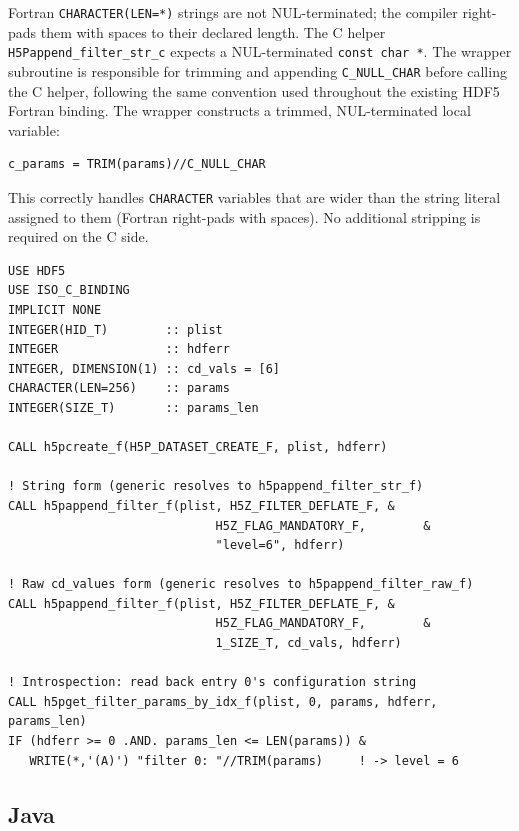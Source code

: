 \documentclass[../RFC-HDFG-2026-001.tex]{subfiles}
\begin{document}
Fortran \texttt{CHARACTER(LEN=*)} strings are not NUL-terminated; the
compiler right-pads them with spaces to their declared length.  The C
helper \texttt{H5Pappend\_filter\_str\_c} expects a NUL-terminated
\texttt{const char~*}.  The wrapper subroutine is responsible for trimming
and appending \texttt{C\_NULL\_CHAR} before calling the C helper, following
the same convention used throughout the existing HDF5 Fortran binding.
The wrapper constructs a trimmed, NUL-terminated local variable:

\begin{verbatim}
c_params = TRIM(params)//C_NULL_CHAR
\end{verbatim}

This correctly handles \texttt{CHARACTER} variables that are wider than the
string literal assigned to them (Fortran right-pads with spaces).  No
additional stripping is required on the C side.


\begin{verbatim}
USE HDF5
USE ISO_C_BINDING
IMPLICIT NONE
INTEGER(HID_T)        :: plist
INTEGER               :: hdferr
INTEGER, DIMENSION(1) :: cd_vals = [6]
CHARACTER(LEN=256)    :: params
INTEGER(SIZE_T)       :: params_len

CALL h5pcreate_f(H5P_DATASET_CREATE_F, plist, hdferr)

! String form (generic resolves to h5pappend_filter_str_f)
CALL h5pappend_filter_f(plist, H5Z_FILTER_DEFLATE_F, &
                             H5Z_FLAG_MANDATORY_F,        &
                             "level=6", hdferr)

! Raw cd_values form (generic resolves to h5pappend_filter_raw_f)
CALL h5pappend_filter_f(plist, H5Z_FILTER_DEFLATE_F, &
                             H5Z_FLAG_MANDATORY_F,        &
                             1_SIZE_T, cd_vals, hdferr)

! Introspection: read back entry 0's configuration string
CALL h5pget_filter_params_by_idx_f(plist, 0, params, hdferr, params_len)
IF (hdferr >= 0 .AND. params_len <= LEN(params)) &
   WRITE(*,'(A)') "filter 0: "//TRIM(params)     ! -> level = 6
\end{verbatim}


\subsection{Java}
\label{sec:java-bindings}
\end{document}
